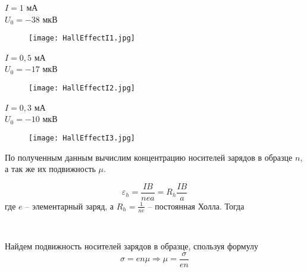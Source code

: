     \begin{center}
        $I = 1$    мА  \\
        $U_0 = -38$ мкВ \\
    \end{center}
    
    \begin{figure}[h!]
        \centering
        \texttt{[image: HallEffectI1.jpg]}
        \caption{}
    \end{figure}

    \begin{center}
        $I = 0,5$    мА  \\
        $U_0 = -17$ мкВ \\
    \end{center}
    
    \begin{figure}[h!]
        \centering
        \texttt{[image: HallEffectI2.jpg]}
        \caption{}
    \end{figure}

    \begin{center}
        $I = 0,3$    мА  \\
        $U_0 = -10$ мкВ \\
    \end{center}
    
    \begin{figure}[h!]
        \centering
        \texttt{[image: HallEffectI3.jpg]}
        \caption{}
    \end{figure}

    \noindent По полученным данным вычислим концентрацию носителей зарядов в образце $n$, а так же их подвижность $\mu$.

    \begin{equation*}
        \varepsilon_h = \frac{I B}{n e a} = R_h \frac{I B}{a}
    \end{equation*}
    где $e$ -- элементарный заряд, а $R_h = \frac{1}{n e}$ -- постоянная Холла. Тогда

    \begin{center}
         \\
    \end{center}

    Найдем подвижность носителей зарядов в образце, спользуя формулу
    \begin{equation*}
        \sigma = e n \mu \Rightarrow \mu = \frac{\sigma}{e n}
    \end{equation*}
